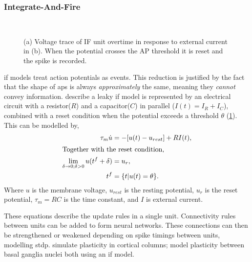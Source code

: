 \subsubsection{Integrate-And-Fire}
\begin{figure}[ht]
	\centering
	\begin{subfigure}[t]{0.48\textwidth}
		\centering
		\caption{}
		
		\label{fig:ifu}
	\end{subfigure}
	~
	\begin{subfigure}[t]{0.48\textwidth}
		\centering
		\caption{}
		
	\end{subfigure}
	\caption{(a) Voltage trace of IF unit overtime in response to external current in (b). When the potential crosses
		the AP threshold it is reset and the spike is recorded.}
	\label{fig:if}
\end{figure}

\acrshort{if} models treat action potentials as events.
This reduction is justified by the fact that the shape of \acrshort{ap}s is always \textit{approximately}
the same, meaning they \textit{cannot} convey information. \cite{gerstner2014if} describe a leaky \acrshort{if} model
is represented by an electrical circuit with a resistor($R$) and a capacitor($C$) in parallel
($I(t) = I_R + I_C$), combined with a reset condition when the potential exceeds a threshold
$\theta$ (\cref{fig:ifu}).
This can be modelled by,
\begin{align}
	\tau_m \dot u                                           & = -[u(t) - u_{rest}] + RI(t),                                    \\
	\intertext{Together with the reset condition,}
	\lim_{\delta \rightarrow 0; \delta > 0} u(t^f + \delta) & = u_r,                                                           \\
	t^f                                                     & = \{t | u(t)                                        = \theta \}.
\end{align}
Where $u$ is the membrane voltage, $u_{rest}$ is the resting potential, $u_r$ is the reset
potential, $\tau_m = RC$ is the time constant, and $I$ is external current.

These equations describe the update rules in a single unit. Connectivity rules between units
can be added to form neural networks. These connections can then be strengthened or weakened
depending on spike timings between units, modelling \acrshort{stdp}. \cite{shupe2021integrate} simulate
plasticity in cortical columns; \cite{kromer2023synaptic} model plasticity between basal ganglia
nuclei both using an \acrshort{if} model.


